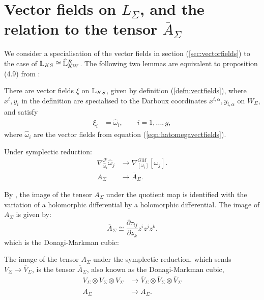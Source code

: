     \section{Vector fields on \texorpdfstring{\(L_\Sigma\)}{L Sigma}, and the relation to the tensor \texorpdfstring{\(\overline{A}_{\Sigma}\)}{A Sigma}}
    \label{sec:vectLsig}

    We consider a specialisation of the vector fields in section (\ref{sec:vectorfields}) to the case of \( \mathbb{L}_{KS} \cong \widehat{\mathbb{L}}^R_{KW} \). The following two lemmas are equivalent to proposition (4.9) from \cite{ks_airy}:
    \begin{lem}  
    \label{vfs}
        There are vector fields \( \xi\) on \(\mathbb{L}_{KS}\), given by definition (\ref{defn:vectfields}), where \(x^i,y_i\) in the definition are specialised to the Darboux coordinates \( x^{i,\alpha},y_{i,\alpha}\) on \(W_\Sigma\), and satisfy
        \begin{align}
        \xi_i&=\widehat{\omega}_i,\qquad i=1,...,g  \label{xiomega},
        \end{align} 
        where \( \widehat{\omega}_i\) are the vector fields from equation (\ref{eqn:hatomegavectfields}).
    \end{lem} 
    
    \begin{lem}
    Under symplectic reduction:
    \begin{align} 
        \nabla^{\mathcal{F}}_{\widehat{\omega}_i}\widehat{\omega}_j&\rightarrow \nabla^{GM}_{[\omega_i]}[\omega_j]  \label{covFGM}. \\
        A_\Sigma& \rightarrow \overline{A}_\Sigma.  \label{AtoA}
    \end{align}
    \end{lem}


    By \cite{chaimanowong2020airy}, the image of the tensor \(A_\Sigma\) under the quotient map is identified with the variation of a holomorphic differential by a holomorphic differential. The image of \(A_\Sigma\) is given by:
    \[\overline{A}_{\Sigma} \cong \frac{\partial\tau_{ij}}{\partial z_k} z^i z^j z^k.\]
    which is the Donagi-Markman cubic:
    \begin{thm}  \label{thm:main}
    The image of the tensor \(A_\Sigma\) under the symplectic reduction, which sends \(V_\Sigma  \rightarrow \overline{V}_\Sigma\),  is the tensor \(\overline{A}_\Sigma\), also known as the Donagi-Markman cubic,
        \begin{align}  \label{eqn:tensquot}
        V_\Sigma\otimes V_\Sigma\otimes V_\Sigma&\to\overline{V}_\Sigma\otimes\overline{V}_\Sigma\otimes\overline{V}_\Sigma\\
        A_\Sigma&\mapsto \overline{A}_\Sigma.\nonumber
    \end{align}
    \end{thm}
    
